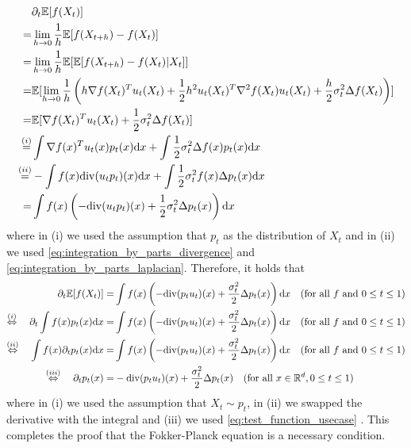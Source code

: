 \begin{align*}
&\partial_t \mathbb{E}[f(X_t)]\\
=&\lim\limits_{h\to 0}
\frac{1}{h}\mathbb{E}[f(X_{t+h})-f(X_t)]\\
=&\lim\limits_{h\to 0}
\frac{1}{h}\mathbb{E}[\mathbb{E}[f(X_{t+h})-f(X_t)|X_t]]\\
=&\mathbb{E}[\lim\limits_{h\to 0}\frac{1}{h}\left(
h\nabla f(X_t)^Tu_t(X_t)+\frac{1}{2}h^2u_t(X_t)^T\nabla^2 f(X_t)u_t(X_t)+\frac{h}{2}\sigma_t^2\Delta f(X_t)
\right)]\\
=&\mathbb{E}[\nabla f(X_t)^Tu_t(X_t)+\frac{1}{2}\sigma_t^2\Delta f(X_t)]\\
\overset{(i)}{=}&\int \nabla f(x)^Tu_t(x)p_t(x)\mathrm{d} x+\int \frac{1}{2}\sigma_t^2\Delta f(x)p_t(x)\mathrm{d} x\\
\overset{(ii)}{=}&-\int f(x)\mathrm{div}(u_t p_t)(x)\mathrm{d} x+\int \frac{1}{2}\sigma_t^2 f(x)\Delta p_t(x)\mathrm{d} x\\
=&\int f(x)\left(-\mathrm{div}(u_t p_t)(x)+\frac{1}{2}\sigma_t^2\Delta p_t(x)\right)\mathrm{d} x
\end{align*}
where in (i) we used the assumption that $p_t$ as the distribution of $X_t$ and in (ii) we used \cref{eq:integration_by_parts_divergence} and \cref{eq:integration_by_parts_laplacian}. Therefore, it holds that
\begin{align}
\partial_t\mathbb{E}[f(X_t)] =& \int f(x)\left(-\mathrm{div} (p_t u_t)(x)+\frac{\sigma_t^2}{2}\Delta p_t (x)\right)\mathrm{d} x\quad (\text{for all }f\text{ and }0\leq t\leq 1)\\
\overset{(i)}{\Leftrightarrow}\quad \partial_t\int f(x) p_t(x)\mathrm{d} x =& \int f(x)\left(-\mathrm{div} (p_tu_t)(x)+\frac{\sigma_t^2}{2}\Delta p_t (x)\right)\mathrm{d} x\quad (\text{for all }f\text{ and }0\leq t\leq 1)\\
\overset{(ii)}{\Leftrightarrow}\quad \int f(x)\partial_t p_t(x)\mathrm{d} x =& \int f(x)\left(-\mathrm{div} (p_t u_t)(x)+\frac{\sigma_t^2}{2}\Delta p_t (x)\right)\mathrm{d} x\quad (\text{for all }f\text{ and }0\leq t\leq 1)\\
\overset{(iii)}{\Leftrightarrow}\quad \partial_t p_t(x) =& -\mathrm{div} (p_t u_t)(x)+\frac{\sigma_t^2}{2}\Delta p_t(x)\quad (\text{for all }x\in\mathbb{R}^d, 0\leq t\leq 1)
\end{align} 
where in (i) we used the assumption that $X_t\sim p_t$, in (ii) we swapped the derivative with the integral and (iii) we used \cref{eq:test_function_usecase}
. This completes the proof that the Fokker-Planck equation is a necessary condition.\\

